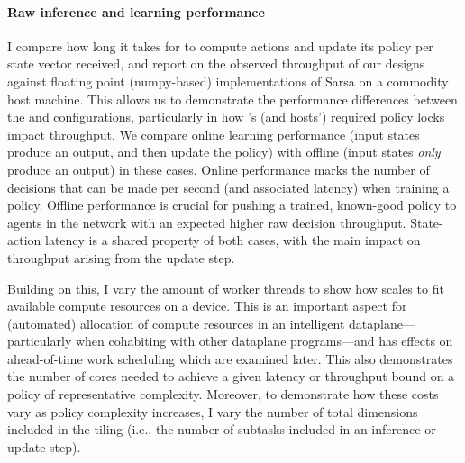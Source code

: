 \paragraph{Raw inference and learning performance}
I compare how long it takes for \approachshort{} to compute actions and update its policy per state vector received, and report on the observed throughput of our designs against floating point (numpy-based) implementations of Sarsa on a commodity host machine.
This allows us to demonstrate the performance differences between the \indfw{} and \coopfw{} configurations, particularly in how \indfw's (and hosts') required policy locks impact throughput.
We compare online learning performance (input states produce an output, and then update the policy) with offline (input states \emph{only} produce an output) in these cases.
Online performance marks the number of decisions that can be made per second (and associated latency) when training a policy.
Offline performance is crucial for pushing a trained, known-good policy to agents in the network with an expected higher raw decision throughput.
State-action latency is a shared property of both cases, with the main impact on throughput arising from the update step.

Building on this, I vary the amount of worker threads to show how \approachshort{} scales to fit available compute resources on a device.
This is an important aspect for (automated) allocation of compute resources in an intelligent dataplane---particularly when cohabiting with other dataplane programs---and has effects on ahead-of-time work scheduling which are examined later.
This also demonstrates the number of cores needed to achieve a given latency or throughput bound on a policy of representative complexity.
Moreover, to demonstrate how these costs vary as policy complexity increases, I vary the number of total dimensions included in the tiling (i.e., the number of subtasks included in an inference or update step).

